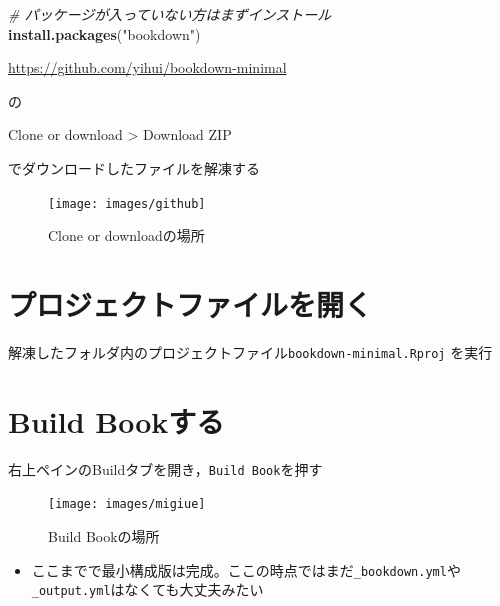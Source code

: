 \documentclass[xelatex, ja=standard, b5paper]{bxjsbook}
\newenvironment{Shaded}{\begin{snugshade}}{\end{snugshade}}
\newcommand{\CommentTok}[1]{\textcolor[rgb]{0.56,0.35,0.01}{\textit{#1}}}
\newcommand{\KeywordTok}[1]{\textcolor[rgb]{0.13,0.29,0.53}{\textbf{#1}}}
\newcommand{\NormalTok}[1]{#1}
\newcommand{\StringTok}[1]{\textcolor[rgb]{0.31,0.60,0.02}{#1}}
\providecommand{\tightlist}{%
  \setlength{\itemsep}{0pt}\setlength{\parskip}{0pt}}
\begin{document}
\begin{Shaded}
\begin{Highlighting}[]
\CommentTok{# パッケージが入っていない方はまずインストール}
\KeywordTok{install.packages}\NormalTok{(}\StringTok{"bookdown"}\NormalTok{)}
\end{Highlighting}
\end{Shaded}

\url{https://github.com/yihui/bookdown-minimal}

の

Clone or download \textgreater{} Download ZIP

でダウンロードしたファイルを解凍する



\begin{figure}

{\centering \texttt{[image: images/github]} 

}

\caption{Clone or downloadの場所}\label{fig:github}
\end{figure}

\hypertarget{hajime_open}{%
\section*{プロジェクトファイルを開く}\label{hajime_open}}

解凍したフォルダ内のプロジェクトファイル\texttt{bookdown-minimal.Rproj} を実行

\hypertarget{hajime_bb}{%
\section*{Build Bookする}\label{hajime_bb}}

右上ペインのBuildタブを開き，\texttt{Build\ Book}を押す



\begin{figure}

{\centering \texttt{[image: images/migiue]} 

}

\caption{Build Bookの場所}\label{fig:migiue}
\end{figure}

\begin{itemize}
\tightlist
\item
  ここまでで最小構成版は完成。ここの時点ではまだ\texttt{\_bookdown.yml}や\texttt{\_output.yml}はなくても大丈夫みたい
\end{itemize}
\end{document}
